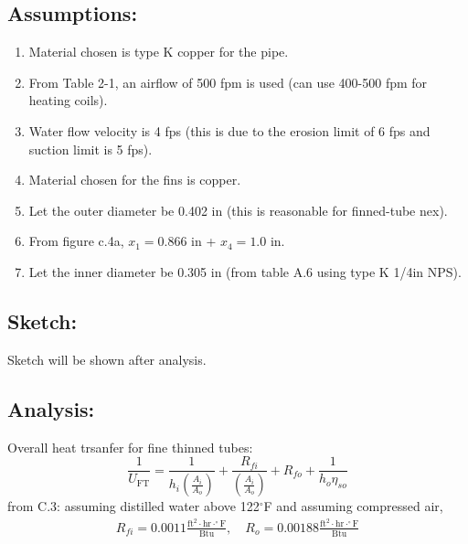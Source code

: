 \subsection{Assumptions:}
\begin{enumerate}
    \item Material chosen is type K copper for the pipe.
    \item From Table 2-1, an airflow of 500 fpm is used (can use 400-500 fpm for heating
          coils).
    \item Water flow velocity is 4 fps (this is due to the erosion limit of 6 fps and
          suction limit is 5 fps).
    \item Material chosen for the fins is copper.
    \item Let the outer diameter be 0.402 in (this is reasonable for finned-tube nex).
    \item From figure c.4a, $x_1 = 0.866$ in + $x_4 = 1.0$ in.
    \item Let the inner diameter be 0.305 in (from table A.6 using type K 1/4in NPS).
\end{enumerate}

\subsection{Sketch:}
Sketch will be shown after analysis.

\subsection{Analysis:}
Overall heat trsanfer for fine thinned tubes:
\begin{equation*}
    \frac{1}{U_{\text{FT}}} = \frac{1}{h_i \left(\frac{A_i}{A_{o}}\right)} + \frac{R_{fi}}{\left(\frac{A_i}{A_{o}}\right)} + R_{fo} + \frac{1}{h_o \eta_{so}}
\end{equation*}
from C.3: assuming distilled water above 122$^\circ$F and assuming compressed air,
\begin{align*}
    R_{fi} = 0.0011 \frac{\text{ft}^2 \cdot \text{hr} \cdot ^\circ \text{F}}{\text{Btu}}, \quad R_{o} = 0.00188 \frac{\text{ft}^2 \cdot \text{hr} \cdot ^\circ \text{F}}{\text{Btu}}
\end{align*}
